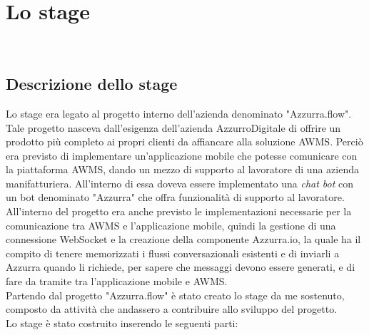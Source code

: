 
\chapter{Lo stage}
\label{cap:descrizione-stage}

\\

\section{Descrizione dello stage}
Lo stage era legato al progetto interno dell'azienda denominato "Azzurra.flow". Tale progetto nasceva dall'esigenza dell'azienda AzzurroDigitale di offrire un prodotto più completo ai propri clienti da affiancare alla soluzione \gls{AWMS}\ap{[g]}. Perciò era previsto di implementare un’applicazione mobile che potesse comunicare con la piattaforma \gls{AWMS}\ap{[g]}, dando un mezzo di supporto al lavoratore di una azienda manifatturiera. All'interno di essa doveva essere implementato una \emph{chat bot} con un \gls{bot}\ap{[g]} denominato "Azzurra" che offra funzionalità di supporto al lavoratore. All'interno del progetto era anche previsto le implementazioni necessarie per la comunicazione tra \gls{AWMS}\ap{[g]} e l'applicazione mobile, quindi la gestione di una connessione \gls{WebSocket}\ap{[g]} e la creazione della componente Azzurra.io, la quale ha il compito di tenere memorizzati i flussi conversazionali esistenti e di inviarli a Azzurra quando li richiede, per sapere che messaggi devono essere generati, e di fare da tramite tra l'applicazione mobile e \gls{AWMS}\ap{[g]}.\\
Partendo dal progetto "Azzurra.flow" è stato creato lo stage da me sostenuto, composto da attività che andassero a contribuire allo sviluppo del progetto. \\
Lo stage è stato costruito inserendo le seguenti parti:

